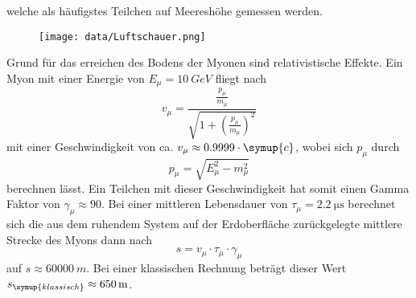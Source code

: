 welche als häufigstes Teilchen auf Meereshöhe gemessen werden.
\begin{figure}[H]
 \centering
 \texttt{[image: data/Luftschauer.png]}
 \label{fig:luftschauer}
\end{figure}
\noindent
Grund für das erreichen des Bodens der Myonen sind relativistische Effekte. Ein Myon mit einer Energie von $E_{\mu} = \SI{10}{GeV}$ fliegt nach 
\begin{equation}
    \label{eqn:t1}
    v_\mu = \frac{\frac{p_\mu}{m_\mu}}{\sqrt{1 + \left( \frac{p_\mu}{m_\mu} \right)^{2}}}
\end{equation}
mit einer Geschwindigkeit von ca. $v_{\mu} \approx 0.9999 \cdot \symup{c}$, wobei sich $p_\mu$ durch 
\begin{equation}
    p_\mu = \sqrt{E_\mu^2 - m_\mu^2}
\end{equation}
berechnen lässt.
Ein Teilchen mit dieser Geschwindigkeit hat somit einen Gamma Faktor von $\gamma_\mu \approx 90$. Bei einer mittleren Lebensdauer von $\tau_{\mu} = \SI{2.2}{\micro\second}$ \cite{pdg} berechnet sich die aus dem ruhendem System auf der Erdoberfläche zurückgelegte mittlere Strecke des Myons dann nach 
\begin{equation}
    \label{eqn:t2}
    s = v_{\mu} \cdot \tau_{\mu} \cdot \gamma_{\mu}
\end{equation}
auf $s \approx \SI{60000}{m}$. Bei einer klassischen Rechnung beträgt dieser Wert $s_{\symup{klassisch}} \approx \SI{650}{m}$.
